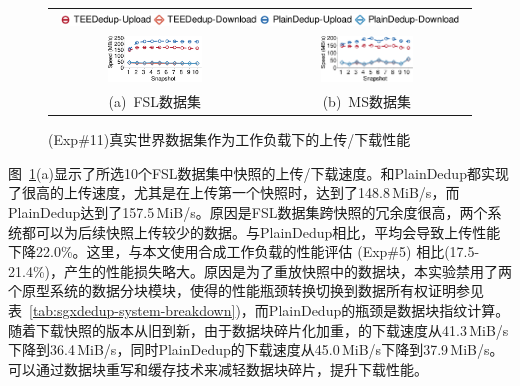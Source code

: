 \begin{figure}[!htb]
    \centering
    \begin{tabular}{cc}
        \multicolumn{2}{c}{\includegraphics[width=0.97\textwidth]{pic/sgxdedup/plot/exp_b2/expb2_trace_legend.pdf}} \\
        \hspace{-0.1in}
        \includegraphics[width=0.47\textwidth]{pic/sgxdedup/plot/exp_b2/expb2_trace_fsl_plain_sgx.pdf} & 
        \includegraphics[width=0.47\textwidth]{pic/sgxdedup/plot/exp_b2/expb2_trace_ms_plain_sgx.pdf}               \\
        \mbox{\small (a) FSL数据集}                                                                    & 
        \mbox{\small (b) MS数据集}
    \end{tabular}
    \caption{(Exp\#11)真实世界数据集作为工作负载下的上传/下载性能}
    \label{fig:sgxdedup-tracePerformance}
\end{figure}

图~\ref{fig:sgxdedup-tracePerformance}(a)显示了所选10个FSL数据集中快照的上传/下载速度。\sysnameS 和PlainDedup都实现了很高的上传速度，尤其是在上传第一个快照时，\sysnameS 达到了148.8\,MiB/s，而PlainDedup达到了157.5\,MiB/s。原因是FSL数据集跨快照的冗余度很高，两个系统都可以为后续快照上传较少的数据。与PlainDedup相比，\sysnameS 平均会导致上传性能下降22.0\%。这里，与本文使用合成工作负载的性能评估 (Exp\#5) 相比(17.5-21.4\%)，产生的性能损失略大。原因是为了重放快照中的数据块，本实验禁用了两个原型系统的数据分块模块，使得\sysnameS 的性能瓶颈转换切换到数据所有权证明参见表~\ref{tab:sgxdedup-system-breakdown})，而PlainDedup的瓶颈是数据块指纹计算。随着下载快照的版本从旧到新，由于数据块碎片化\cite{lillibridge13}加重，\sysnameS 的下载速度从41.3\,MiB/s下降到36.4\,MiB/s，同时PlainDedup的下载速度从45.0\,MiB/s下降到37.9\,MiB/s。\sysnameS 可以通过数据块重写和缓存\cite{lillibridge13,cao2018ALACC}技术来减轻数据块碎片，提升下载性能。

